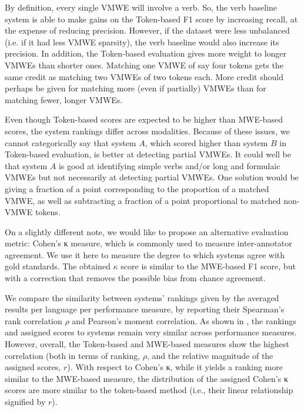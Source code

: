 \documentclass[output=paper,modfonts,nonflat,draftmode]{langsci/langscibook}
\begin{document}
By definition, every single VMWE will involve a verb. So, the verb baseline system is able to make gains on the Token-based F1 score by increasing recall, at the expense of reducing precision. However, if the dataset were less unbalanced (i.e. if it had less VMWE sparsity), the verb baseline would also increase its precision. In addition, the Token-based evaluation gives more weight to longer VMWEs than shorter ones. Matching one VMWE of say four tokens gets the same credit as matching two VMWEs of two tokens each. More credit should perhaps be given for matching more (even if partially) VMWEs than for matching fewer, longer VMWEs. 


Even though Token-based scores are expected to be higher than MWE-based scores, the system rankings differ across modalities. Because of these issues, we cannot categorically say that system $A$, which scored higher than system $B$ in Token-based evaluation, is better at detecting partial VMWEs. It could well be that system $A$ is good at identifying simple verbs and/or long and formulaic VMWEs but not necessarily at detecting partial VMWEs. One solution would be giving a fraction of a point corresponding to the proportion of a matched VMWE, as well as subtracting a fraction of a point proportional to matched non-VMWE tokens. 

On a slightly different note, we would like to propose an alternative evaluation metric: Cohen's κ measure, which is commonly used to measure inter-annotator agreement. We use it here to measure the degree to which systems agree with gold standards. The obtained $\kappa$ score is similar to the MWE-based F1 score, but with a correction that removes the possible bias from chance agreement. 

We compare the similarity between systems' rankings given by the averaged results per language per performance measure, by reporting their Spearman's rank correlation $\rho$ and Pearson's moment correlation. As shown in , the rankings and assigned scores to systems remain very similar across performance measures. However, overall, the Token-based and MWE-based measures show the highest correlation (both in terms of ranking, $\rho$, and the relative magnitude of the assigned scores, $r$). With respect to Cohen's κ, while it yields a ranking more similar to the MWE-based measure, the distribution of the assigned Cohen's κ scores are more similar to the token-based method (i.e., their linear relationship signified by $r$).
\end{document}
